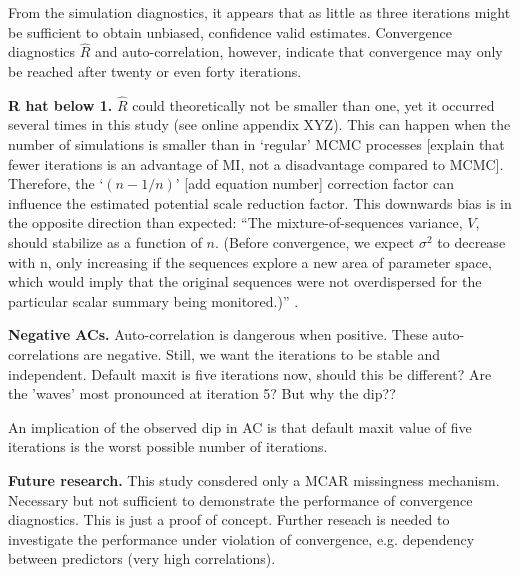 \documentclass[article]{jss}
\begin{document}
From the simulation diagnostics, it appears that as little as three iterations might be sufficient to obtain unbiased, confidence valid estimates. Convergence diagnostics $\widehat{R}$ and auto-correlation, however, indicate that convergence may only be reached after twenty or even forty iterations. 

\textbf{R hat below 1.}
$\widehat{R}$ could theoretically not be smaller than one, yet it occurred several times in this study (see online appendix XYZ). This can happen when the number of simulations is smaller than in `regular' MCMC processes [explain that fewer iterations is an advantage of MI, not a disadvantage compared to MCMC]. Therefore, the `$(n-1/n)$' [add equation number] correction factor can influence the estimated potential scale reduction factor. This downwards bias is in the opposite direction than expected: ``The mixture-of-sequences variance, $V$, should stabilize as a function of $n$. (Before convergence, we expect $\sigma^2$ to decrease with n, only increasing if the sequences explore a new area of parameter space, which would imply that the original sequences were not overdispersed for the particular scalar summary being monitored.)'' \cite[p~438]{broo98}.


\textbf{Negative ACs.} Auto-correlation is dangerous when positive. These auto-correlations are negative. Still, we want the iterations to be stable and independent. Default maxit is five iterations now, should this be different? Are the 'waves' most pronounced at iteration 5? But why the dip??  

An implication of the observed dip in AC is that default maxit value of five iterations is the worst possible number of iterations.

\textbf{Future research.} This study consdered only a MCAR missingness mechanism. Necessary but not sufficient to demonstrate the performance of convergence diagnostics. This is just a proof of concept. Further reseach is needed to investigate the performance under violation of convergence, e.g. dependency between predictors (very high correlations). %
\end{document}
